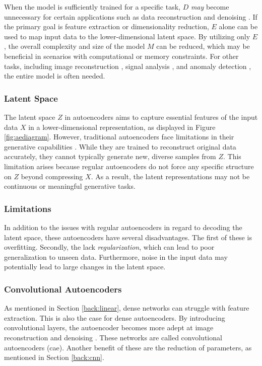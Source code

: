 When the model is sufficiently trained for a specific task, $D$ \textit{may} become unnecessary for certain applications such as data reconstruction and denoising \cite{vincent2010stacked}. If the primary goal is feature extraction or dimensionality reduction, $E$ alone can be used to map input data to the lower-dimensional latent space. By utilizing only $E$, the overall complexity and size of the model $M$ can be reduced, which may be beneficial in scenarios with computational or memory constraints. For other tasks, including image reconstruction \cite{7797236}, signal analysis \cite{andrysiak2016machine}, and anomaly detection \cite{bank2021autoencoders}, the entire model is often needed.
\subsubsection{Latent Space}

The latent space $Z$ in autoencoders aims to capture essential features of the input data $X$ in a lower-dimensional representation, as displayed in Figure \ref{fig:aediagram}. However, traditional autoencoders face limitations in their generative capabilities \cite{bank2021autoencoders}. While they are trained to reconstruct original data accurately, they cannot typically generate new, diverse samples from $Z$. This limitation arises because regular autoencoders do not force any specific structure on $Z$ beyond compressing $X$. As a result, the latent representations may not be continuous or meaningful generative tasks.

\subsubsection{Limitations}
In addition to the issues with regular autoencoders in regard to decoding the latent space, these autoencoders have several disadvantages. The first of these is overfitting. Secondly, the lack \textit{regularization}, which can lead to poor generalization to unseen data. Furthermore, noise in the input data may potentially lead to large changes in the latent space. 

\subsubsection{Convolutional Autoencoders}
As mentioned in Section \ref{back:linear}, dense networks can struggle with feature extraction. This is also the case for dense autoencoders. By introducing convolutional layers, the autoencoder becomes more adept at image reconstruction and denoising \cite{zhang2018better}. These networks are called convolutional autoencoders (\acrshort{cae}). Another benefit of these are the reduction of parameters, as mentioned in Section \ref{back:cnn}.

